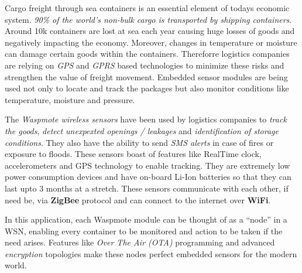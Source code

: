 \documentclass[fleqn, letterpaper, 11.5pt]{article}
\begin{document}
\begin{itemize}
Cargo freight through sea containers is an essential element of todays economic system. \textit{90\% of the world's non-bulk cargo is transported by shipping containers}\cite{libelium2}. Around 10k containers are lost at sea each year causing huge losses of goods and negatively impacting the economy. Moreover, changes in temperature or moisture can damage certain goods within the containers. Thereforre logistics companies are relying on \textit{GPS} and \textit{GPRS} based technologies to minimize these risks and strengthen the value of freight movement. Embedded sensor modules are being used not only to locate and track the packages but also monitor conditions like temperature, moisture and pressure.\par
The \textit{Waspmote wireless sensors}\cite{waspmote} have been used by logistics companies to \textit{track the goods}, \textit{detect unexpexted openings / leakages} and \textit{identification of storage conditions}. They also have the ability to send \textit{SMS alerts} in case of fires or exposure to floods. These sensors boast of features like RealTime clock, accelerometers and GPS technology to enable tracking. They are extremely low power consumption devices and have on-board Li-Ion batteries so that they can last upto 3 months at a stretch. These sensors communicate with each other, if need be, via \textbf{ZigBee} protocol and can connect to the internet over \textbf{WiFi}.\par
In this application, each Waspmote module can be thought of as a \enquote{node} in a WSN, enabling every container to be monitored and action to be taken if the need arises. Features like \textit{Over The Air (OTA)} programming and advanced \textit{encryption} topologies make these nodes perfect embedded sensors for the modern world.\par

\end{itemize}

\bigskip




\end{document}

